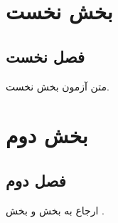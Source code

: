 \documentclass[oneside,openany]{book}
\begin{document}
\tableofcontents

\part{بخش نخست}\label{part:first}
\chapter{فصل نخست}
متن آزمون بخش نخست.

\part{بخش دوم}\label{part:second}
\chapter{فصل دوم}
ارجاع به بخش \ref{part:first} و بخش \ref{part:second}.
\end{document}
